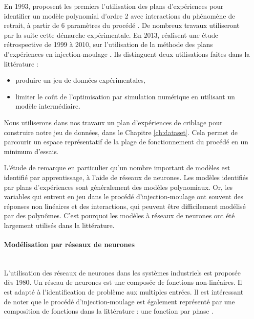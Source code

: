 En 1993, \citeauthor{regnier_local_1993} proposent les premiers l'utilisation des plans d'expériences pour identifier un modèle polynomial d'ordre 2 avec interactions du phénomène de retrait, à partir de 6 paramètres du procédé \cite{regnier_local_1993, regnier_experimental_1994}.
De nombreux travaux utiliseront par la suite cette démarche expérimentale.
En 2013, \citeauthor{fei_practical_2013} réalisent une étude rétrospective de 1999 à 2010, sur l’utilisation de la méthode des plans d'expériences en injection-moulage \cite{fei_practical_2013}.  %
Ils distinguent deux utilisations faites dans la littérature :
\begin{itemize}
	\item produire un jeu de données expérimentales,
	\item limiter le coût de l'optimisation par simulation numérique en utilisant un modèle intermédiaire.
\end{itemize}

Nous utiliserons dans nos travaux un plan d'expériences de criblage pour construire notre jeu de données, dans le Chapitre \ref{ch:dataset}.
Cela permet de parcourir un espace représentatif de la plage de fonctionnement du procédé en un minimum d'essais.

L'étude de \citeauthor{fei_practical_2013} remarque en particulier qu'un nombre important de modèles est identifié par apprentissage, à l'aide de réseaux de neurones.
Les modèles identifiés par plans d'expériences sont généralement des modèles polynomiaux.
Or, les variables qui entrent en jeu dans le procédé d'injection-moulage ont souvent des réponses non linéaires et des interactions, qui peuvent être difficilement modélisé par des polynômes.
C'est pourquoi les modèles à réseaux de neurones ont été largement utilisés dans la littérature.

\paragraph{Modélisation par réseaux de neurones}\mbox{} \label{parag:molding_neural} \\
L'utilisation des réseaux de neurones dans les systèmes industriels est proposée dès 1980.
Un réseau de neurones est une composée de fonctions non-linéaires.
Il est adapté à l'identification de problème aux multiples entrées.
Il est intéressant de noter que le procédé d'injection-moulage est également représenté par une composition de fonctions dans la littérature : une fonction par phase \cite{ma_design_1974}.

